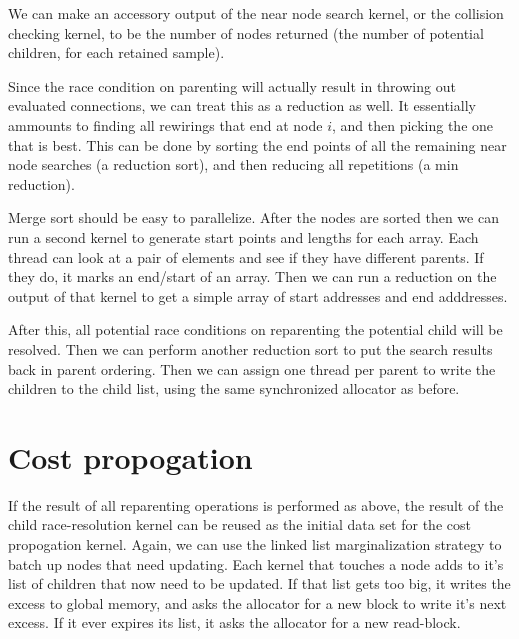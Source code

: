 We can make an accessory output of the near node search kernel, or the collision checking kernel, to be the number of nodes returned (the number of potential children, for each retained sample). 

Since the race condition on parenting will actually result in throwing out evaluated connections, we can treat this as a reduction as well. It essentially ammounts to finding all rewirings that end at node $i$, and then picking the one that is best. This can be done by sorting the end points of all the remaining near node searches (a reduction sort), and then reducing all repetitions (a min reduction). 
 
\begin{figure}[H]
\begin{centering}
    \texttt{[image: \\figfile\{fig/kernel\_near\_rotate]}}
    \caption{Near Reduction}
\end{centering} 
\end{figure}

Merge sort should be easy to parallelize. After the nodes are sorted then we can run a second kernel to generate start points and lengths for each array. Each thread can look at a pair of elements and see if they have different parents. If they do, it marks an end/start of an array. Then we can run a reduction on the output of that kernel to get a simple array of start addresses and end adddresses. 

After this, all potential race conditions on reparenting the potential child will be resolved. Then we can perform another reduction sort to put the search results back in parent ordering. Then we can assign one thread per parent to write the children to the child list, using the same synchronized allocator as before. 
 
\begin{figure}[H]
\begin{centering}
    \texttt{[image: \\figfile\{fig/kernel\_parent\_rotate]}}
    \caption{Parent Reduction}
\end{centering} 
\end{figure} 


\section{Cost propogation}
If the result of all reparenting operations is performed as above, the result of the child race-resolution kernel can be reused as the initial data set for the cost propogation kernel. Again, we can use the linked list marginalization strategy to batch up nodes that need updating. Each kernel that touches a node adds to it's list of children that now need to be updated. If that list gets too big, it writes the excess to global memory, and asks the allocator for a new block to write it's next excess. If it ever expires its list, it asks the allocator for a new read-block.







 
